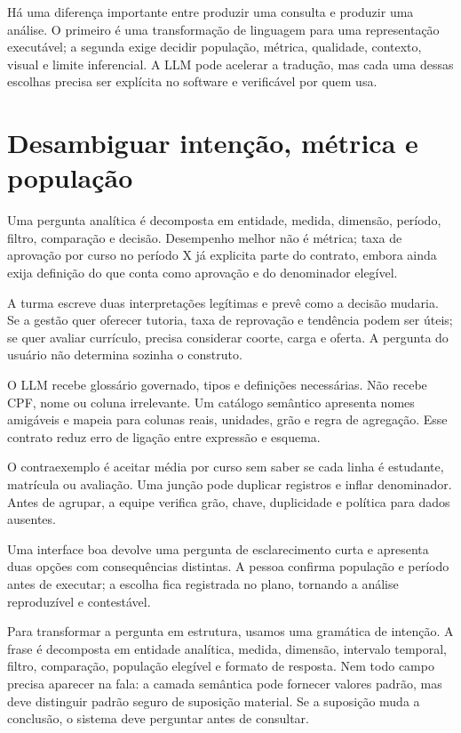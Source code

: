 Há uma diferença importante entre produzir uma consulta e produzir uma análise. O primeiro é uma transformação de linguagem para uma representação executável; a segunda exige decidir população, métrica, qualidade, contexto, visual e limite inferencial. A LLM pode acelerar a tradução, mas cada uma dessas escolhas precisa ser explícita no software e verificável por quem usa.

\section{Desambiguar intenção, métrica e população}

Uma pergunta analítica é decomposta em entidade, medida, dimensão, período, filtro, comparação e decisão. Desempenho melhor não é métrica; taxa de aprovação por curso no período X já explicita parte do contrato, embora ainda exija definição do que conta como aprovação e do denominador elegível.

A turma escreve duas interpretações legítimas e prevê como a decisão mudaria. Se a gestão quer oferecer tutoria, taxa de reprovação e tendência podem ser úteis; se quer avaliar currículo, precisa considerar coorte, carga e oferta. A pergunta do usuário não determina sozinha o construto.

O LLM recebe glossário governado, tipos e definições necessárias. Não recebe CPF, nome ou coluna irrelevante. Um catálogo semântico apresenta nomes amigáveis e mapeia para colunas reais, unidades, grão e regra de agregação. Esse contrato reduz erro de ligação entre expressão e esquema.

O contraexemplo é aceitar média por curso sem saber se cada linha é estudante, matrícula ou avaliação. Uma junção pode duplicar registros e inflar denominador. Antes de agrupar, a equipe verifica grão, chave, duplicidade e política para dados ausentes.

Uma interface boa devolve uma pergunta de esclarecimento curta e apresenta duas opções com consequências distintas. A pessoa confirma população e período antes de executar; a escolha fica registrada no plano, tornando a análise reproduzível e contestável.

Para transformar a pergunta em estrutura, usamos uma gramática de intenção. A frase é decomposta em entidade analítica, medida, dimensão, intervalo temporal, filtro, comparação, população elegível e formato de resposta. Nem todo campo precisa aparecer na fala: a camada semântica pode fornecer valores padrão, mas deve distinguir padrão seguro de suposição material. Se a suposição muda a conclusão, o sistema deve perguntar antes de consultar.

